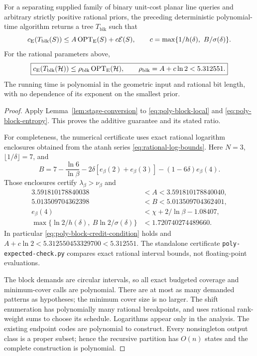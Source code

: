 \begin{theorem}
\label{thm:poly-block-expected}
For a separating supplied family of binary unit-cost planar line queries
and arbitrary strictly positive rational priors, the preceding
deterministic polynomial-time algorithm returns a tree $T_{\mathrm{blk}}$
such that
\[
 c_{\mathrm E}(T_{\mathrm{blk}}(S))
 \le A\operatorname{OPT}_{\mathrm E}(S)+c\mathcal E(S),\qquad
 c=\max\{1/h(\delta),\ B/\sigma(\delta)\}.
\]
For the rational parameters above,
\begin{equation}\label{eq:poly-block-factor}
 \boxed{c_{\mathrm E}(T_{\mathrm{blk}}(\mathcal H))
 \le\rho_{\mathrm{blk}}\operatorname{OPT}_{\mathrm E}(\mathcal H),\qquad
 \rho_{\mathrm{blk}}=A+c\ln2<5.312551.}
\end{equation}
The running time is polynomial in the geometric input and rational bit
length, with no dependence of its exponent on the smallest prior.
\end{theorem}
\begin{proof}
Apply Lemma~\ref{lem:stage-conversion} to
\eqref{eq:poly-block-local} and \eqref{eq:poly-block-entropy}.
This proves the additive guarantee and its stated ratio.

For completeness, the numerical certificate uses exact rational
logarithm enclosures obtained from the atanh series
\eqref{eq:rational-log-bounds}. Here $N=3$, $\lfloor1/\delta\rfloor=7$,
and
\[
 B=7-\frac{\ln6}{\ln\beta}
       -2\delta[e_\beta(2)+e_\beta(3)]
       -(1-6\delta)e_\beta(4).
\]
Those enclosures certify $\lambda_\beta>\nu_\beta$ and
\[
 \begin{aligned}
 3.591810178840038&<A<3.591810178840040,\\
 5.013509704362398&<B<5.013509704362401,\\
 e_\beta(4)&<\chi+2/\ln\beta-1.08407,\\
 \max\{\ln2/h(\delta),\ B\ln2/\sigma(\delta)\}
 &<1.720740274489660.
 \end{aligned}
\]
In particular \eqref{eq:poly-block-credit-condition} holds and
$A+c\ln2<5.312550453329700<5.312551$.
The standalone certificate \texttt{poly-expected-check.py} compares
exact rational interval bounds, not floating-point evaluations.

The block demands are circular intervals, so all exact budgeted
coverage and minimum-cover calls are polynomial. There are at most
as many demanded patterns as hypotheses; the minimum cover size is
no larger. The shift enumeration has polynomially many rational
breakpoints, and uses rational rank-weight sums to choose its schedule.
Logarithms appear only in the analysis. The existing endpoint codes
are polynomial to construct. Every nonsingleton output class is a
proper subset; hence the recursive partition has $O(n)$ states and
the complete construction is polynomial.
\end{proof}

